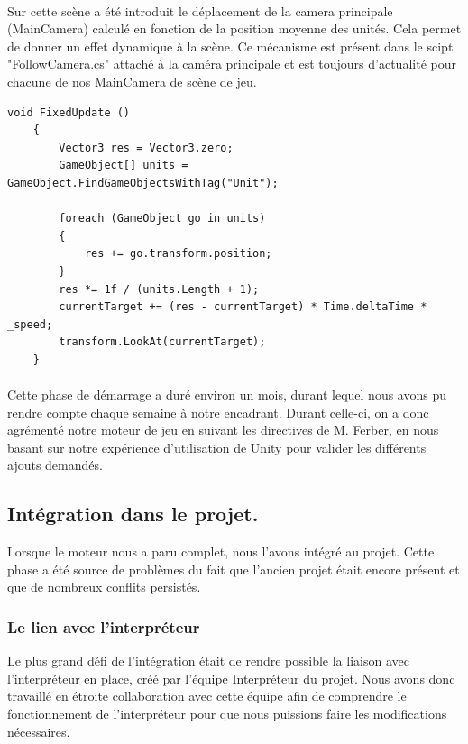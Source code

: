 \documentclass{report}
\begin{document}
\paragraph{}
Sur cette scène a été introduit le déplacement de la camera principale (MainCamera) calculé en fonction de la position moyenne des unités. Cela permet de donner un effet dynamique à la scène. Ce mécanisme est présent dans le scipt "FollowCamera.cs" attaché à la caméra principale et est toujours d'actualité pour chacune de nos MainCamera de scène de jeu.
\begin{lstlisting}[language={[Sharp]C},label={lst:FollowCamera}, caption=  Extrait du code du script  FollowCamera.cs]
void FixedUpdate ()
    {
        Vector3 res = Vector3.zero;
        GameObject[] units = GameObject.FindGameObjectsWithTag("Unit");

        foreach (GameObject go in units)
        {
            res += go.transform.position;
        }
        res *= 1f / (units.Length + 1);
        currentTarget += (res - currentTarget) * Time.deltaTime * _speed;
        transform.LookAt(currentTarget);
    }
\end{lstlisting}

\paragraph{}
Cette phase de démarrage a duré environ un mois, durant lequel nous avons pu rendre compte chaque semaine à notre encadrant. Durant celle-ci, on a donc agrémenté notre moteur de jeu en suivant les directives de M. Ferber, en nous basant sur notre expérience d'utilisation de Unity pour valider les différents ajouts demandés.

\subsection{Intégration dans le projet.}
Lorsque le moteur nous a paru complet, nous l'avons intégré au projet. Cette phase a été source de problèmes du fait que l'ancien projet était encore présent et que de nombreux conflits persistés.

\subsubsection{Le lien avec l’interpréteur} 
Le plus grand défi de l’intégration était de rendre possible la liaison avec l’interpréteur en place, créé par l'équipe Interpréteur du projet. Nous avons donc travaillé en étroite collaboration avec cette équipe afin de comprendre le fonctionnement de l’interpréteur pour que nous puissions faire les modifications nécessaires.
\end{document}
